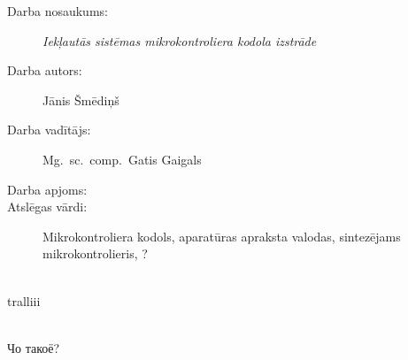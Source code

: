\abstitlestyle{\abstractname} %
\noindent%
\begin{description}
	\item[Darba nosaukums:]
		\textit{Iekļautās sistēmas mikrokontroliera kodola izstrāde}
	\item[Darba autors:] Jānis Šmēdiņš
	\item[Darba vadītājs:] Mg.~sc.~comp.~Gatis Gaigals
	\item[Darba apjoms:] \todo
	\item[Atslēgas vārdi:] Mikrokontroliera kodols, aparatūras apraksta valodas,
		sintezējams mikrokontrolieris, \todo ?
\end{description}

\todo\\
tralliii


\clearpage
\begin{english} %
	\abstitlestyle{\abstractname} %
	\todo
\end{english}

\clearpage
\begin{russian} %
	\abstitlestyle{\abstractname} %
	
	\todo \\
	Чо такоё?
\end{russian}
